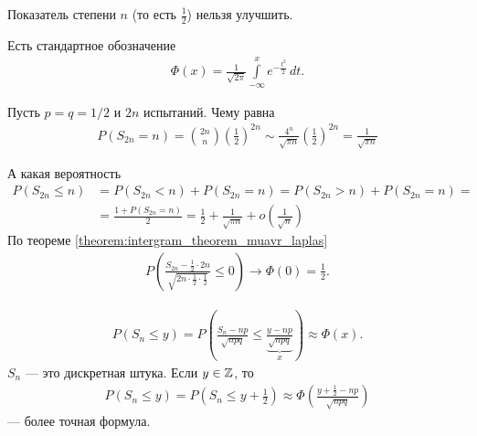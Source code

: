 \begin{remrk*}
 Показатель степени $n$ (то есть $\frac{1}{2}$) нельзя улучшить.
\end{remrk*}

\begin{notatn*}
 Есть стандартное обозначение
 \begin{align*}
  \Phi(x) = \frac{1}{\sqrt{2\pi}} \int\limits_{-\infty}^{x} e^{-\frac{t^{2}}{2}}\,dt
 .\end{align*} 
\end{notatn*}

\begin{exmpl*}
 Пусть $p = q = 1 / 2$ и  $2n$ испытаний. Чему равна
 \begin{align*}
  P(S_{2n} = n) = \binom {2n} n \left( \frac{1}{2} \right)^{2n} \sim \frac{4^{n}}{\sqrt{\pi n}} \left( \frac{1}{2} \right)^{2n} = \frac{1}{\sqrt{\pi n}}
 \end{align*} 

 А какая вероятность
 \begin{align*}
  P(S_{2n} \leqslant n) &= P(S_{2n} < n) + P(S_{2n} = n) = P(S_{2n} > n) + P(S_{2n} = n) = \\
  &= \frac{1 + P(S_{2n} = n)}{2} = \frac{1}{2} + \frac{1}{\sqrt{\pi n}} + o \left( \frac{1}{\sqrt{n}} \right)
 \end{align*} По теореме \ref{theorem:intergram_theorem_muavr_laplas}
 \begin{align*}
  P\left(\frac{S_{2n} - \frac{1}{2} \cdot 2n}{\sqrt{2n \cdot \frac{1}{2} \cdot \frac{1}{2}}} \leqslant 0\right) \to \Phi(0) = \frac{1}{2}.
 \end{align*} 
\end{exmpl*}

\begin{remrk*}
 \begin{align*}
  P(S_n \leqslant y) = P\left(\frac{S_n - np}{\sqrt{npq}} \leqslant \underbrace{\frac{y - np}{\sqrt{npq}}}_{x}\right) \approx \Phi(x)
 .\end{align*} $S_n$ --- это дискретная штука. Если  $y \in \mathbb{Z}$, то
 \begin{align*}
  P(S_n \leqslant y) = P\left(S_n \leqslant y + \frac{1}{2}\right) \approx \Phi \left( \frac{y + \frac{1}{2} - np}{\sqrt{npq}} \right)
 \end{align*} --- более точная формула.
\end{remrk*}
